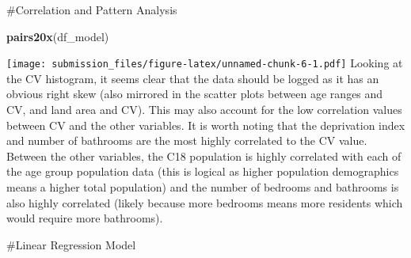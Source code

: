 \documentclass[
]{article}
\newenvironment{Shaded}{\begin{snugshade}}{\end{snugshade}}
\newcommand{\KeywordTok}[1]{\textcolor[rgb]{0.13,0.29,0.53}{\textbf{#1}}}
\newcommand{\NormalTok}[1]{#1}
\begin{document}
\#Correlation and Pattern Analysis

\begin{Shaded}
\begin{Highlighting}[]
\KeywordTok{pairs20x}\NormalTok{(df_model)}
\end{Highlighting}
\end{Shaded}

\texttt{[image: submission\_files/figure-latex/unnamed-chunk-6-1.pdf]}
Looking at the CV histogram, it seems clear that the data should be
logged as it has an obvious right skew (also mirrored in the scatter
plots between age ranges and CV, and land area and CV). This may also
account for the low correlation values between CV and the other
variables. It is worth noting that the deprivation index and number of
bathrooms are the most highly correlated to the CV value. Between the
other variables, the C18 population is highly correlated with each of
the age group population data (this is logical as higher population
demographics means a higher total population) and the number of bedrooms
and bathrooms is also highly correlated (likely because more bedrooms
means more residents which would require more bathrooms).

\#Linear Regression Model
\end{document}
